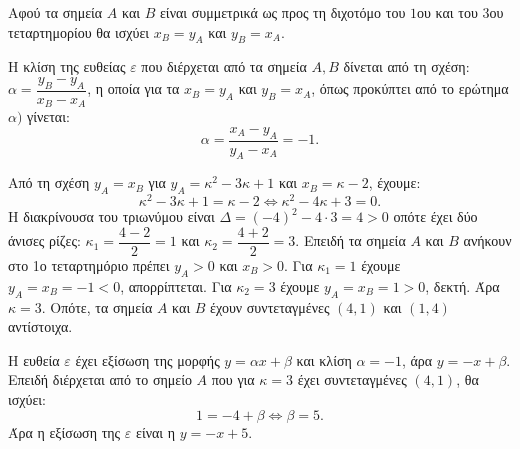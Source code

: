 
\begin{alist}
\item Αφού τα σημεία $A$ και $B$ είναι συμμετρικά ως προς τη διχοτόμο του $1$ου και του $3$ου τεταρτημορίου θα ισχύει $x_B = y_A$ και $y_B = x_A$.

\item Η κλίση της ευθείας $\varepsilon$ που διέρχεται από τα σημεία $A, B$ δίνεται από τη σχέση:
$\alpha = \dfrac{y_B - y_A}{x_B - x_A}$,
η οποία για τα $x_B = y_A$ και $y_B = x_A$, όπως προκύπτει από το ερώτημα $\alpha)$ γίνεται:
\[\alpha = \dfrac{x_A - y_A}{y_A - x_A} = -1.\]

\item 
\begin{rlist}
\item Από τη σχέση $y_A = x_B$ για $y_A = \kappa^2 - 3\kappa + 1$ και $x_B = \kappa - 2$, έχουμε:
\[\kappa^2 - 3\kappa + 1 = \kappa - 2 \Leftrightarrow \kappa^2 - 4\kappa + 3 = 0.\]
Η διακρίνουσα του τριωνύμου είναι $\Delta = (-4)^2 - 4 \cdot 3 = 4 > 0$ οπότε έχει δύο άνισες ρίζες:
$\kappa_1 = \dfrac{4 - 2}{2} = 1$ και $\kappa_2 = \dfrac{4 + 2}{2} = 3$.
Επειδή τα σημεία $A$ και $B$ ανήκουν στο 1ο τεταρτημόριο πρέπει $y_A > 0$ και $x_B > 0$.
Για $\kappa_1 = 1$ έχουμε $y_A = x_B = -1 < 0$, απορρίπτεται.
Για $\kappa_2 = 3$ έχουμε $y_A = x_B = 1 > 0$, δεκτή.
Άρα $\kappa = 3$.
Οπότε, τα σημεία $A$ και $B$ έχουν συντεταγμένες $(4, 1)$ και $(1, 4)$ αντίστοιχα.
\item Η ευθεία $\varepsilon$ έχει εξίσωση της μορφής $y = \alpha x + \beta$ και κλίση $\alpha = -1$, άρα
$y = -x + \beta$.
Επειδή διέρχεται από το σημείο $A$ που για $\kappa = 3$ έχει συντεταγμένες $(4, 1)$, θα ισχύει:
\[1 = -4 + \beta \Leftrightarrow \beta = 5.\]
Άρα η εξίσωση της $\varepsilon$ είναι η $y = -x + 5$.
\end{rlist}
\end{alist}

